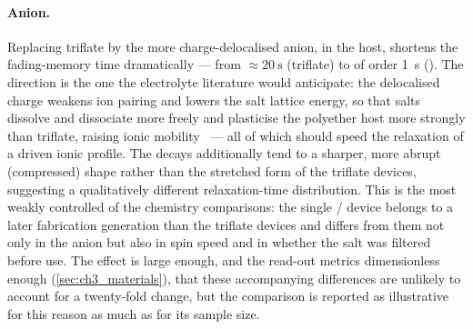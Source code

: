 \documentclass[12pt, twoside]{report}
\begin{document}
\paragraph{Anion.} Replacing triflate by the more charge-delocalised \TFSI{} anion, in the \PEO{} host, shortens the fading-memory time dramatically --- from \(\approx\SI{20}{\second}\) (triflate) to of order \SI{1}{\second} (\TFSI{}). The direction is the one the electrolyte literature would anticipate: the delocalised \TFSI{} charge weakens ion pairing and lowers the salt lattice energy, so that \TFSI{} salts dissolve and dissociate more freely and plasticise the polyether host more strongly than triflate, raising ionic mobility~\cite{Vallee1992,BruceVincent1993} --- all of which should speed the relaxation of a driven ionic profile. The \TFSI{} decays additionally tend to a sharper, more abrupt (compressed) shape rather than the stretched form of the triflate devices, suggesting a qualitatively different relaxation-time distribution. This is the most weakly controlled of the chemistry comparisons: the single \PEO{}/\TFSI{} device belongs to a later fabrication generation than the triflate devices and differs from them not only in the anion but also in spin speed and in whether the salt was filtered before use. The effect is large enough, and the read-out metrics dimensionless enough (\cref{sec:ch3_materials}), that these accompanying differences are unlikely to account for a twenty-fold change, but the comparison is reported as illustrative for this reason as much as for its sample size.
\end{document}
